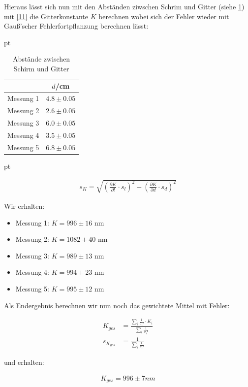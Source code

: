 \documentclass[12pt]{article}
\newcommand{\del}[2][]{\frac{\partial #1}{\partial #2}}
\begin{document}
Hieraus lässt sich nun mit den Abständen ziwschen Schrim und Gitter (siehe \ref{Tabelle}) mit \ref{11} die Gitterkonstante $K$ berechnen wobei sich der Fehler wieder mit Gauß'scher Fehlerfortpflanzung berechnen lässt:

  pt
 \begin{table}[h!]
 {\centering{}
\begin{tabular}{c|c}
 					& $d$/cm 		\\ \hline\hline
Messung 1		& $4.8 \pm 0.05$ 	 \\ \hline 
Messung 2	&	 $2.6 \pm 0.05$ 	   	  \\ \hline
Messung 3      	&  $6.0 \pm 0.05$    \\ \hline
Messung 4    & $3.5 \pm 0.05$         \\ \hline                                           
Messung 5  & $6.8 \pm 0.05$  
 \end{tabular}
 \caption{Abstände zwischen Schirm und Gitter }\label{Tabelle}}
\end{table}
 pt

\begin{align*}
s_K = \sqrt{\left(\del[K]{l}\cdot s_{l}\right)^2+\left(\del[K]{d}\cdot s_{d}\right)^2}
\end{align*}

Wir erhalten:

\begin{itemize}
\item Messung 1: $K = 996 \pm 16$ nm
\item Messung 2: $K = 1082 \pm 40$ nm
\item Messung 3: $K = 989 \pm 13$ nm
\item Messung 4: $K = 994 \pm 23$ nm
\item Messung 5: $K = 995 \pm 12$ nm
\end{itemize}

Als Endergebnis berechnen wir nun noch das gewichtete Mittel mit Fehler:

\begin{align*}
K_{ges} &=\frac{\sum\limits_i \frac{1}{\sigma_i²} \cdot K_i}{\sum\limits_i \frac{1}{\sigma_i²}}\\
s_{K_{ges}} &= \frac{1}{\sum\limits_i \frac{1}{\sigma_i²}}
\end{align*}

und erhalten:

\begin{align*}
K_{ges} = 996 \pm 7 nm
\end{align*}
\end{document}

